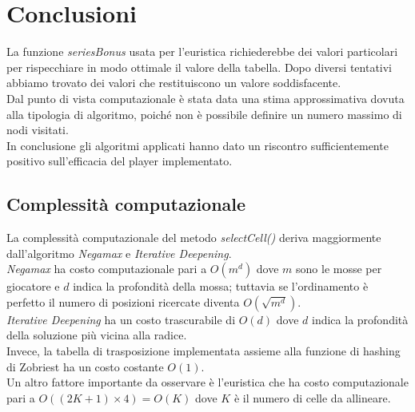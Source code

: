 \documentclass{article}
\begin{document}
    
    
    \section{Conclusioni}
    La funzione \textit{seriesBonus} usata per l'euristica richiederebbe dei valori particolari per rispecchiare in modo ottimale il valore della tabella. Dopo diversi tentativi abbiamo trovato dei valori che restituiscono un valore soddisfacente.\\
    Dal punto di vista computazionale è stata data una stima approssimativa dovuta alla tipologia di algoritmo, poiché non è possibile definire un numero massimo di nodi visitati.\\
    In conclusione gli algoritmi applicati hanno dato un riscontro sufficientemente positivo sull'efficacia del player implementato.
    
    \subsection{Complessità computazionale}
    La complessità computazionale del metodo \textit{selectCell()} deriva maggiormente dall'algoritmo \textit{Negamax} e \textit{Iterative Deepening}.\\
    \textit{Negamax} ha costo computazionale pari a $O(m^d)$
    dove $m$ sono le mosse per giocatore e $d$ indica la profondità della mossa; tuttavia se l'ordinamento è perfetto il numero di posizioni ricercate diventa $O(\sqrt{m^d})$.\\
    \textit{Iterative Deepening} ha un costo trascurabile di $O(d)$ dove $d$ indica la profondità della soluzione più vicina alla radice.\\
    Invece, la tabella di trasposizione implementata assieme alla funzione di hashing di Zobriest ha un costo costante $O(1)$.\\
    Un altro fattore importante da osservare è l'euristica che ha costo computazionale pari a $O((2K+1)\times 4)=O(K)$ dove $K$ è il numero di celle da allineare.
\end{document}
